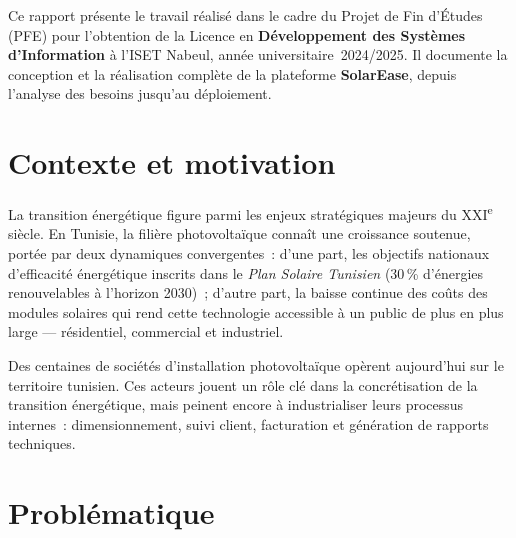 
\vspace{-6pt}
\begin{tcolorbox}[
  enhanced, colback=sectionbg, colframe=isetblue!40,
  arc=4pt, boxrule=0pt,
  borderline west={4pt}{0pt}{isetgold},
  left=10pt, right=10pt, top=6pt, bottom=6pt,
  fontupper=\small\itshape\color{darkgray}
]
Ce rapport présente le travail réalisé dans le cadre du Projet de Fin d'Études
(PFE) pour l'obtention de la Licence en \textbf{Développement des Systèmes
d'Information} à l'ISET Nabeul, année universitaire~2024/2025.
Il documente la conception et la réalisation complète de la plateforme
\textbf{SolarEase}, depuis l'analyse des besoins jusqu'au déploiement.
\end{tcolorbox}

\vspace{12pt}

\section*{Contexte et motivation}

La transition énergétique figure parmi les enjeux stratégiques majeurs du
XXI\textsuperscript{e} siècle. En Tunisie, la filière photovoltaïque connaît
une croissance soutenue, portée par deux dynamiques convergentes~:
d'une part, les objectifs nationaux d'efficacité énergétique inscrits dans
le \textit{Plan Solaire Tunisien} (30\,\% d'énergies renouvelables à
l'horizon 2030)~; d'autre part, la baisse continue des coûts des modules
solaires qui rend cette technologie accessible à un public de plus en plus
large --- résidentiel, commercial et industriel.

Des centaines de sociétés d'installation photovoltaïque opèrent aujourd'hui
sur le territoire tunisien. Ces acteurs jouent un rôle clé dans la
concrétisation de la transition énergétique, mais peinent encore à
industrialiser leurs processus internes~: dimensionnement, suivi client,
facturation et génération de rapports techniques.

\section*{Problématique}

